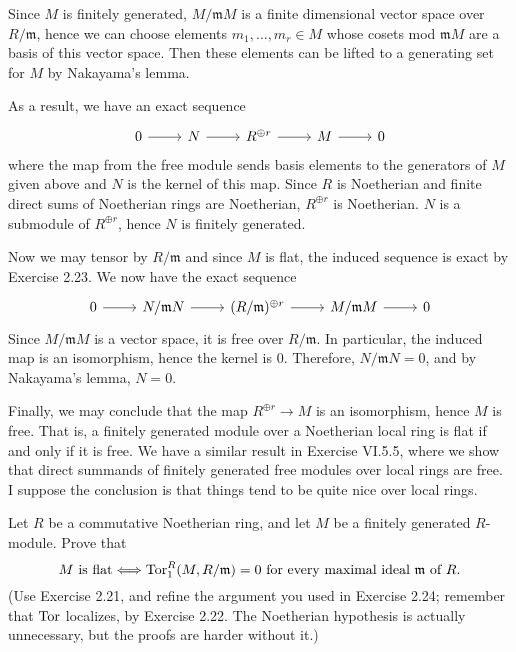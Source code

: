 \documentclass[../../master.tex]{subfiles}
\begin{document}
\begin{solution}
    Since $M$ is finitely generated, $M/\mathfrak{m}M$ is a finite dimensional vector space over $R/\mathfrak{m}$, hence we can choose elements $m_1, \ldots, m_r \in M$ whose cosets mod $\mathfrak{m}M$ are a basis of this vector space.
    Then these elements can be lifted to a generating set for $M$ by Nakayama's lemma.

    As a result, we have an exact sequence
    \[
    \begin{tikzcd}
        0 & N & R^{\oplus r} & M & 0
        \arrow[from=1-1, to=1-2]
        \arrow[from=1-2, to=1-3]
        \arrow[from=1-3, to=1-4]
        \arrow[from=1-4, to=1-5] 
    \end{tikzcd}
    \]
    where the map from the free module sends basis elements to the generators of $M$ given above and $N$ is the kernel of this map.
    Since $R$ is Noetherian and finite direct sums of Noetherian rings are Noetherian, $R^{\oplus r}$ is Noetherian.
    $N$ is a submodule of $R^{\oplus r}$, hence $N$ is finitely generated.

    Now we may tensor by $R/\mathfrak{m}$ and since $M$ is flat, the induced sequence is exact by Exercise 2.23.
    We now have the exact sequence
    \[
    \begin{tikzcd}
        0 & N/\mathfrak{m}N & (R/\mathfrak{m})^{\oplus r} & M/\mathfrak{m}M & 0
        \arrow[from=1-1, to=1-2]
        \arrow[from=1-2, to=1-3]
        \arrow[from=1-3, to=1-4]
        \arrow[from=1-4, to=1-5] 
    \end{tikzcd}
    \]
    Since $M/\mathfrak{m}M$ is a vector space, it is free over $R/\mathfrak{m}$.
    In particular, the induced map is an isomorphism, hence the kernel is 0.
    Therefore, $N/\mathfrak{m}N = 0$, and by Nakayama's lemma, $N = 0$.

    Finally, we may conclude that the map $R^{\oplus r} \to M$ is an isomorphism, hence $M$ is free.
    That is, a finitely generated module over a Noetherian local ring is flat if and only if it is free.
    We have a similar result in Exercise VI.5.5, where we show that direct summands of finitely generated free modules over local rings are free.
    I suppose the conclusion is that things tend to be quite nice over local rings.
\end{solution}

\begin{problem}
    Let $R$ be a commutative Noetherian ring, and let $M$ be a finitely generated $R$-module.
    Prove that
    \[
        M \text{ is flat} \Longleftrightarrow \operatorname{Tor}_1^{R}(M, R/\mathfrak{m}) = 0 \text{ for every maximal ideal $\mathfrak{m}$ of $R$.}
    \]
    (Use Exercise 2.21, and refine the argument you used in Exercise 2.24;
    remember that $\operatorname{Tor}$ localizes, by Exercise 2.22.
    The Noetherian hypothesis is actually unnecessary, but the proofs are harder without it.)
\end{problem}
\end{document}
